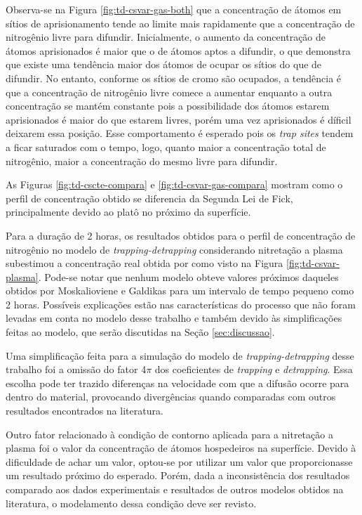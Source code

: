 Observa-se na Figura \ref{fig:td-csvar-gas-both} que a concentração de átomos em sítios de aprisionamento tende ao limite mais rapidamente que a concentração de nitrogênio livre para difundir. Inicialmente, o aumento da concentração de átomos aprisionados é maior que o de átomos aptos a difundir, o que demonstra que existe uma tendência maior dos átomos de ocupar os sítios do que de difundir. No entanto, conforme os sítios de cromo são ocupados, a tendência é que a concentração de nitrogênio livre comece a aumentar enquanto a outra concentração se mantém constante pois a possibilidade dos átomos estarem aprisionados é maior do que estarem livres, porém uma vez aprisionados é díficil deixarem essa posição. Esse comportamento é esperado pois os \textit{trap sites} tendem a ficar saturados com o tempo, logo, quanto maior a concentração total de nitrogênio, maior a concentração do mesmo livre para difundir.

As Figuras \ref{fig:td-cscte-compara} e \ref{fig:td-csvar-gas-compara} mostram como o perfil de concentração obtido se diferencia da Segunda Lei de Fick, principalmente devido ao platô no próximo da superfície.


Para a duração de 2 horas, os resultados obtidos para o perfil de concentração de nitrogênio no modelo de \textit{trapping-detrapping} considerando nitretação a plasma subestimou a concentração real obtida por \cite{moskalioviene2011modeling} como visto na Figura \ref{fig:td-csvar-plasma}. Pode-se notar que nenhum modelo obteve valores próximos daqueles obtidos por Moskalioviene e Galdikas para um intervalo de tempo pequeno como 2 horas. Possíveis explicações estão nas características do processo que não foram levadas em conta no modelo desse trabalho e também devido às simplificações feitas ao modelo, que serão discutidas na Seção \ref{sec:discussao}.

Uma simplificação feita para a simulação do modelo de \textit{trapping-detrapping} desse trabalho foi a omissão do fator 4$\pi$ dos coeficientes de \textit{trapping} e  \textit{detrapping}. Essa escolha pode ter trazido diferenças na velocidade com que a difusão ocorre para dentro do material, provocando divergências quando comparadas com outros resultados encontrados na literatura.

Outro fator relacionado à condição de contorno aplicada para a nitretação a plasma foi o valor da concentração de átomos hospedeiros na superfície. Devido à dificuldade de achar um valor, optou-se por utilizar um valor que proporcionasse um resultado próximo do esperado. Porém, dada a inconsistência dos resultados comparado aos dados experimentais e resultados de outros modelos obtidos na literatura, o modelamento dessa condição deve ser revisto. 


